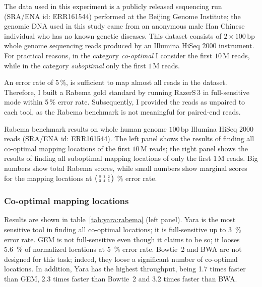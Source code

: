 The data used in this experiment is a publicly released sequencing run (SRA/ENA id: ERR161544) performed at the Beijing Genome Institute;
the genomic DNA used in this study came from an anonymous male Han Chinese individual who has no known genetic diseases.
This dataset consists of $2 \times 100\,\text{bp}$ whole genome sequencing reads produced by an Illumina HiSeq 2000 instrument.
For practical reasons, in the category \emph{co-optimal} I consider the first $10\,\text{M}$ reads, while in the category \emph{suboptimal} only the first $1\,\text{M}$ reads.

An error rate of 5\,\%, is sufficient to map almost all reads in the dataset.
Therefore, I built a Rabema gold standard by running RazerS\,3 in full-sensitive mode within 5\,\% error rate.
Subsequently, I provided the reads as unpaired to each tool, as the Rabema benchmark is not meaningful for paired-end reads.

\begin{table*}[t]
  \caption[Yara results in the Rabema benchmark]
  {
  \label{tab:yara:rabema}
    Rabema benchmark results on whole human genome $100\,\text{bp}$ Illumina HiSeq 2000 reads (SRA/ENA id: ERR161544).
    The left panel shows the results of finding all co-optimal mapping locations of the first $10\,\text{M}$ reads; the right panel shows the results of finding all suboptimal mapping locations of only the first $1\,\text{M}$ reads.
    Big numbers show total Rabema scores, while small numbers show marginal scores for the mapping locations at
    $\bigl(\begin{smallmatrix}\mbox{\tiny 0}&\mbox{\tiny 1}&\mbox{\tiny 2}\\\mbox{\tiny 3}&\mbox{\tiny 4}&\mbox{\tiny 5}\end{smallmatrix}\bigr)$ \% error rate.
    }
  \vspace{-3mm}
  \center
  \sffamily
  \resizebox{0.99\textwidth}{!}
  {
	\renewcommand{\tabcolsep}{0.8ex}
	
	
  }
\end{table*}

\subsubsection{Co-optimal mapping locations}
Results are shown in table~\ref{tab:yara:rabema} (left panel).
Yara is the most sensitive tool in finding all co-optimal locations; it is full-sensitive up to 3~\% error rate.
GEM is not full-sensitive even though it claims to be so; it looses 5.6~\% of normalized locations at 5~\% error rate.
Bowtie~2 and BWA are not designed for this task; indeed, they loose a significant number of co-optimal locations.
In addition, Yara has the highest throughput, being 1.7 times faster than GEM, 2.3 times faster than Bowtie~2 and 3.2 times faster than BWA.

